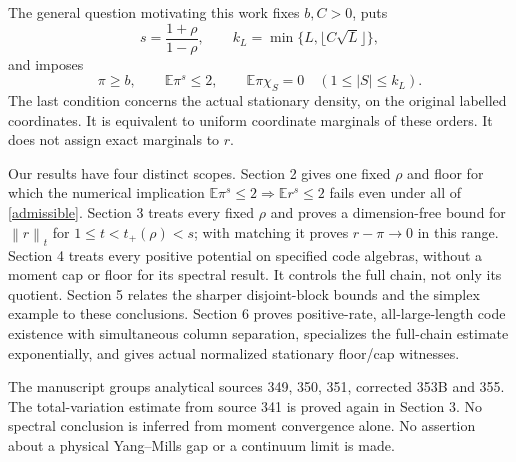 \documentclass[11pt]{article}
\newcommand{\E}{\mathbb E}
\newcommand{\norm}[1]{\left\|#1\right\|}
\begin{document}
The general question motivating this work fixes $b,C>0$, puts
\[
 s=\frac{1+\rho}{1-\rho},\qquad k_L=\min\{L,\lfloor C\sqrt L\rfloor\},
\]
and imposes
\begin{equation}\label{admissible}
 \pi\geq b,\qquad \E\pi^s\leq2,\qquad
 \E\pi\chi_S=0\quad(1\leq |S|\leq k_L).
\end{equation}
The last condition concerns the actual stationary density, on the original labelled coordinates. It is equivalent to uniform coordinate marginals of these orders. It does not assign exact marginals to $r$.

Our results have four distinct scopes. Section 2 gives one fixed $\rho$ and floor for which the numerical implication $\E\pi^s\leq2\Rightarrow\E r^s\leq2$ fails even under all of \eqref{admissible}. Section 3 treats every fixed $\rho$ and proves a dimension-free bound for $\norm r_t$ for $1\leq t<t_+(\rho)<s$; with matching it proves $r-\pi\to0$ in this range. Section 4 treats every positive potential on specified code algebras, without a moment cap or floor for its spectral result. It controls the full chain, not only its quotient. Section 5 relates the sharper disjoint-block bounds and the simplex example to these conclusions. Section 6 proves positive-rate, all-large-length code existence with simultaneous column separation, specializes the full-chain estimate exponentially, and gives actual normalized stationary floor/cap witnesses.

The manuscript groups analytical sources 349, 350, 351, corrected 353B and 355. The total-variation estimate from source 341 is proved again in Section 3. No spectral conclusion is inferred from moment convergence alone. No assertion about a physical Yang--Mills gap or a continuum limit is made.
\end{document}
